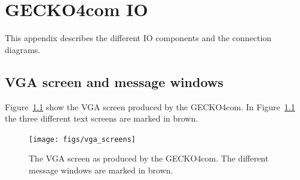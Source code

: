 \chapter{{\sc GECKO4com} IO}
\label{appen:4com}
This appendix describes the different IO components and the connection diagrams.
\section{VGA screen and message windows}
Figure~\ref{fig:vga screenshot} show the VGA screen produced by the {\sc GECKO4com}. In
Figure~\ref{fig:vga screenshot} the three different text screens are marked in brown.
\begin{figure}[h]
\centering%
\texttt{[image: figs/vga\_screens]}
\caption{The VGA screen as produced by the {\sc GECKO4com}. The different
message windows are marked in brown.}
\label{fig:vga screenshot}
\end{figure}

